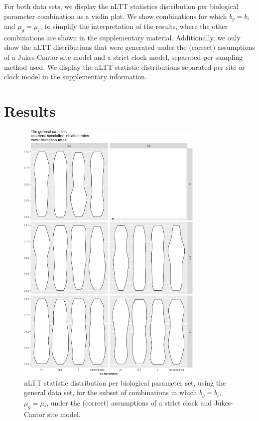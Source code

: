 \documentclass{article}
\begin{document}
For both data sets, we display the nLTT statistics distribution per
biological parameter combination as a violin plot.
We show combinations for which $b_g = b_i$ and $\mu_g = \mu_i$,
to simplify the interpretation of the results, where the other combinations
are shown in the supplementary material.
Additionally, we only show the nLTT distributions
that were generated under the (correct) assumptions of a Jukes-Cantor site model
and a strict clock model, separated per sampling method used. 
We display the nLTT statistic distributions separated per site or clock model 
in the supplementary information.

\section{Results}

\begin{figure}[!htbp]
  \includegraphics[width=0.8\textwidth]{fig_general.png}
  \caption{
    nLTT statistic distribution per biological parameter set, using the
    general data set, 
    for the subset of combinations in which $b_g = b_i$, $\mu_g = \mu_i$, 
    under the (correct) assumptions of a strict clock and Jukes-Cantor site model.
  }
\end{figure}
\end{document}

